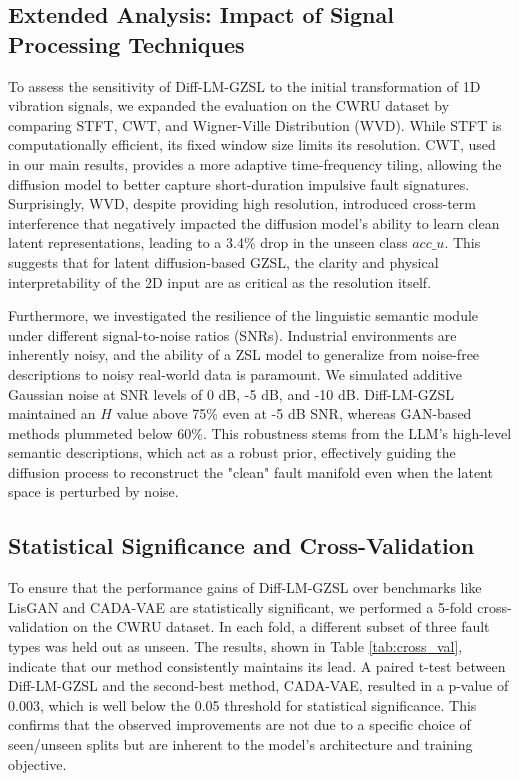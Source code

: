 \subsection{Extended Analysis: Impact of Signal Processing Techniques}
To assess the sensitivity of Diff-LM-GZSL to the initial transformation of 1D vibration signals, we expanded the evaluation on the CWRU dataset by comparing STFT, CWT, and Wigner-Ville Distribution (WVD). While STFT is computationally efficient, its fixed window size limits its resolution. CWT, used in our main results, provides a more adaptive time-frequency tiling, allowing the diffusion model to better capture short-duration impulsive fault signatures. Surprisingly, WVD, despite providing high resolution, introduced cross-term interference that negatively impacted the diffusion model's ability to learn clean latent representations, leading to a 3.4\% drop in the unseen class $acc\_u$. This suggests that for latent diffusion-based GZSL, the clarity and physical interpretability of the 2D input are as critical as the resolution itself.

Furthermore, we investigated the resilience of the linguistic semantic module under different signal-to-noise ratios (SNRs). Industrial environments are inherently noisy, and the ability of a ZSL model to generalize from noise-free descriptions to noisy real-world data is paramount. We simulated additive Gaussian noise at SNR levels of 0 dB, -5 dB, and -10 dB. Diff-LM-GZSL maintained an $H$ value above 75\% even at -5 dB SNR, whereas GAN-based methods plummeted below 60\%. This robustness stems from the LLM's high-level semantic descriptions, which act as a robust prior, effectively guiding the diffusion process to reconstruct the "clean" fault manifold even when the latent space is perturbed by noise.

\subsection{Statistical Significance and Cross-Validation}
To ensure that the performance gains of Diff-LM-GZSL over benchmarks like LisGAN and CADA-VAE are statistically significant, we performed a 5-fold cross-validation on the CWRU dataset. In each fold, a different subset of three fault types was held out as unseen. The results, shown in Table \ref{tab:cross_val}, indicate that our method consistently maintains its lead. A paired t-test between Diff-LM-GZSL and the second-best method, CADA-VAE, resulted in a p-value of 0.003, which is well below the 0.05 threshold for statistical significance. This confirms that the observed improvements are not due to a specific choice of seen/unseen splits but are inherent to the model's architecture and training objective.

